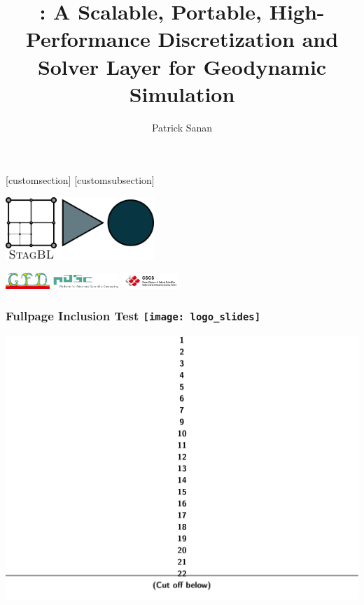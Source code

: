 \documentclass{beamer}
\author[Patrick Sanan]{Patrick Sanan}
\institute{ETH Zurich}
\title[\StagBL{}]{\StagBL: A Scalable, Portable, High-Performance Discretization and Solver Layer for Geodynamic Simulation}
\date{}
\newcommand\frametitlelogo[1]{\frametitle{#1\hspace{0pt plus 1 filll} \texttt{[image: logo\_slides]}}}
\begin{document}
[customsection]
[customsubsection]

\begin{frame}[fragile]
\titlepage
\begin{center}
\includegraphics[width=0.42\textwidth]{logo}
\end{center}
\begin{center}
\includegraphics[height=1.6em]{GFD_t}
\hspace{2pt}
\hspace{4pt}
\includegraphics[height=1.6em]{pasc_avec}
\hspace{2pt}
\includegraphics[height=1.6em]{CSCS_RGB}
\end{center}
\end{frame}

\begin{frame}
  \frametitlelogo{Fullpage Inclusion Test }
  \includegraphics[width=\textwidth]{template.pdf}
\end{frame}
\end{document}
